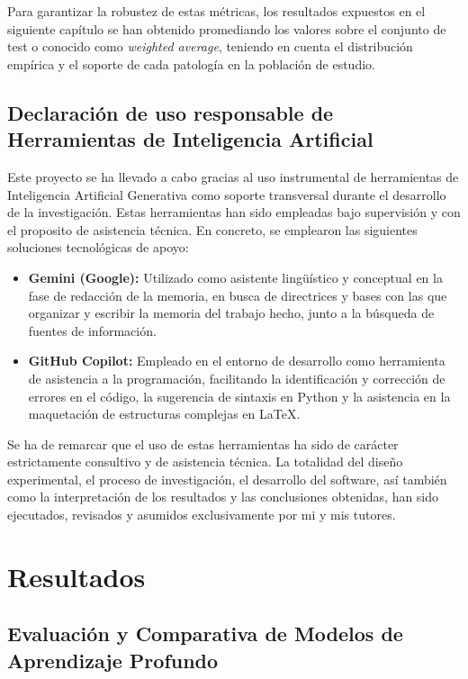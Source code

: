 \documentclass[12pt,a4paper,onecolumn,oneside]{report}
\begin{document}
Para garantizar la robustez de estas métricas, los resultados expuestos en el siguiente capítulo se han obtenido promediando los valores sobre el conjunto de test o conocido como \textit{weighted average}, teniendo en cuenta el distribución empírica y el soporte de cada patología en la población de estudio.

\section{Declaración de uso responsable de Herramientas de Inteligencia Artificial}

Este proyecto se ha llevado a cabo gracias al uso instrumental de herramientas de Inteligencia Artificial Generativa  como soporte transversal durante el desarrollo de la investigación. Estas herramientas han sido empleadas bajo supervisión y con el proposito de asistencia técnica. En concreto, se emplearon las siguientes soluciones tecnológicas de apoyo:

\begin{itemize}
    \item \textbf{Gemini (Google):} Utilizado como asistente lingüístico y conceptual en la fase de redacción de la memoria, en busca de directrices y bases con las que organizar y escribir la memoria del trabajo hecho, junto a la búsqueda de fuentes de información.
    \item \textbf{GitHub Copilot:} Empleado en el entorno de desarrollo como herramienta de asistencia a la programación, facilitando la identificación y corrección de errores en el código, la sugerencia de sintaxis en Python y la asistencia en la maquetación de estructuras complejas en \LaTeX.
\end{itemize}

Se ha de remarcar que el uso de estas herramientas ha sido de carácter estrictamente consultivo y de asistencia técnica. La totalidad del diseño experimental, el proceso de investigación, el desarrollo del software, así también como la interpretación de los resultados y las conclusiones obtenidas, han sido ejecutados, revisados y asumidos exclusivamente por mi y mis tutores.

\chapter{Resultados}

\section{Evaluación y Comparativa de Modelos de Aprendizaje Profundo}
\end{document}
